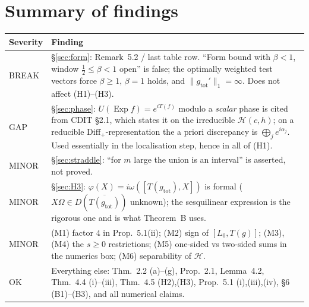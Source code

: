 \documentclass[11pt]{article}
\newcommand{\Om}{\Omega}
\newcommand{\Hil}{\mathcal H}
\newcommand{\Diff}{\mathrm{Diff}_+}
\newcommand{\nrm}[1]{\lVert #1\rVert}
\newcommand{\gtot}{g_{\mathrm{tot}}}
\newcommand{\Exp}{\operatorname{Exp}}
\begin{document}
\section{Summary of findings}\label{sec:summary}

\begin{center}\small
\begin{tabularx}{\textwidth}{l >{\raggedright\arraybackslash}X}\toprule
Severity & Finding\\\midrule
BREAK & \S\ref{sec:form}: Remark~5.2 / last table row.  ``Form bound with $\beta<1$, window
$\frac12\le\beta<1$ open'' is false; the optimally weighted test vectors force $\beta\ge1$, $\beta=1$ holds, and
$\nrm{\gtot'}_1=\infty$.  Does not affect (H1)--(H3).\\
GAP & \S\ref{sec:phase}: $U(\Exp f)=e^{iT(f)}$ modulo a \emph{scalar} phase is cited from CDIT \S2.1, which
states it on the irreducible $\Hil(c,h)$; on a reducible $\Diff$-representation the a priori discrepancy is
$\bigoplus_je^{i\alpha_j}$.  Used essentially in the localisation step, hence in all of (H1).\\
MINOR & \S\ref{sec:straddle}: ``for $m$ large the union is an interval'' is asserted, not proved.\\
MINOR & \S\ref{sec:H3}: $\varphi(X)=i\omega([T(\gtot),X])$ is formal ($X\Om\in D(\overline{T(\gtot)})$ unknown);
the sesquilinear expression is the rigorous one and is what Theorem~B uses.\\
MINOR & (M1) factor $4$ in Prop.~5.1(ii); (M2) sign of $[L_0,T(g)]$; (M3),(M4) the $s\ge0$ restrictions;
(M5) one-sided vs two-sided sums in the numerics box; (M6) separability of $\Hil$.\\
OK & Everything else: Thm.~2.2 (a)--(g), Prop.~2.1, Lemma~4.2, Thm.~4.4 (i)--(iii), Thm.~4.5 (H2),(H3),
Prop.~5.1 (i),(iii),(iv), \S6 (B1)--(B3), and all numerical claims.\\
\bottomrule
\end{tabularx}
\end{center}
\end{document}
